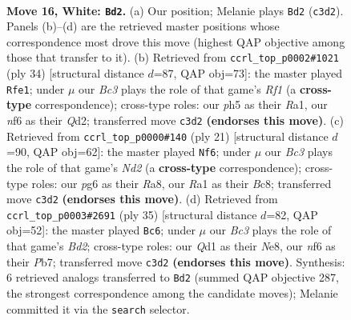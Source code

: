 \documentclass[11pt]{article}
\begin{document}
\clearpage

\begin{figure}[p]\centering
\begin{subfigure}{0.46\textwidth}\centering
\resizebox{\linewidth}{!}{%
\newchessgame
\chessboard[
  setfen={r1b1k2r/2p1qp2/2n2np1/3p3p/p2P4/P1B2NP1/4PPBP/R2QR1K1 w kq - 0 16},
  showmover=false,
  pgfstyle=straightmove, color=movearrow, markmove={c3-d2}
]}
\caption{}
\end{subfigure}\hfill
\begin{subfigure}{0.46\textwidth}\centering
\resizebox{\linewidth}{!}{%
\newchessgame
\chessboard[
  setfen={r3k2r/pp1q1p2/2n3pb/2p1Pn2/3p1P2/3P1NP1/PP1QBB2/R4RK1 w kq - 2 18},
  showmover=false,
  pgfstyle=straightmove, color=movearrow, markmove={f1-e1}
]}
\caption{}
\end{subfigure}
\\[4pt]
\begin{subfigure}{0.46\textwidth}\centering
\resizebox{\linewidth}{!}{%
\newchessgame
\chessboard[
  setfen={r1bq1rk1/1p1nbppp/p2p4/4p3/P3P3/2NQ1N2/1PP2PPP/R1BR2K1 b - - 0 11},
  showmover=false,
  pgfstyle=straightmove, color=movearrow, markmove={d7-f6}
]}
\caption{}
\end{subfigure}\hfill
\begin{subfigure}{0.46\textwidth}\centering
\resizebox{\linewidth}{!}{%
\newchessgame
\chessboard[
  setfen={2r1nrk1/1pqbbppp/p2pp3/P7/4PP2/2NRBNQ1/1PP3PP/R6K b - - 7 18},
  showmover=false,
  pgfstyle=straightmove, color=movearrow, markmove={d7-c6}
]}
\caption{}
\end{subfigure}
\caption{\textbf{Move 16, White: \texttt{Bd2}.} (a) Our position; Melanie plays \texttt{Bd2} (\texttt{c3d2}). Panels (b)--(d) are the retrieved master positions whose correspondence most drove this move (highest QAP objective among those that transfer to it). (b) Retrieved from \texttt{ccrl\_top\_p0002\#1021} (ply 34) [structural distance $d$=87, QAP obj=73]: the master played \texttt{Rfe1}; under $\mu$ our \emph{Bc3} plays the role of that game's \emph{Rf1} (a \textbf{cross-type} correspondence); cross-type roles: our \emph{p}h5 as their \emph{R}a1, our \emph{n}f6 as their \emph{Q}d2; transferred move \texttt{c3d2} \textbf{(endorses this move)}. (c) Retrieved from \texttt{ccrl\_top\_p0000\#140} (ply 21) [structural distance $d$=90, QAP obj=62]: the master played \texttt{Nf6}; under $\mu$ our \emph{Bc3} plays the role of that game's \emph{Nd2} (a \textbf{cross-type} correspondence); cross-type roles: our \emph{p}g6 as their \emph{R}a8, our \emph{R}a1 as their \emph{B}c8; transferred move \texttt{c3d2} \textbf{(endorses this move)}. (d) Retrieved from \texttt{ccrl\_top\_p0003\#2691} (ply 35) [structural distance $d$=82, QAP obj=52]: the master played \texttt{Bc6}; under $\mu$ our \emph{Bc3} plays the role of that game's \emph{Bd2}; cross-type roles: our \emph{Q}d1 as their \emph{N}e8, our \emph{n}f6 as their \emph{P}b7; transferred move \texttt{c3d2} \textbf{(endorses this move)}. Synthesis: 6 retrieved analogs transferred to \texttt{Bd2} (summed QAP objective 287, the strongest correspondence among the candidate moves); Melanie committed it via the \texttt{search} selector.}
\label{fig:thought-m30}
\end{figure}
\end{document}
